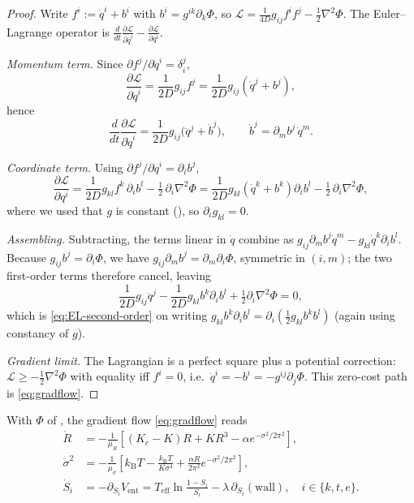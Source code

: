 \documentclass[11pt,twocolumn,a4paper]{article}
\newcommand{\Lag}{\mathcal{L}}
\newcommand{\Pot}{\Phi}
\newcommand{\kB}{k_{\mathrm{B}}}
\newcommand{\Kc}{K_c}
\newcommand{\Ord}{R}
\begin{document}
\begin{proof}
Write $f^i:=\dot q^i+b^i$ with $b^i=g^{ik}\partial_k\Pot$, so
$\Lag=\frac{1}{4D}g_{ij}f^if^j-\tfrac12\nabla^2\Pot$. The Euler--Lagrange
operator is $\frac{d}{dt}\frac{\partial\Lag}{\partial\dot q^i}
-\frac{\partial\Lag}{\partial q^i}$.

\emph{Momentum term.} Since $\partial f^j/\partial\dot q^i=\delta^j_i$,
\[
\frac{\partial\Lag}{\partial\dot q^i}=\frac{1}{2D}g_{ij}f^j
=\frac{1}{2D}g_{ij}(\dot q^j+b^j),
\]
hence
\[
\frac{d}{dt}\frac{\partial\Lag}{\partial\dot q^i}
=\frac{1}{2D}g_{ij}\big(\ddot q^j+\dot b^j\big),
\qquad \dot b^j=\partial_m b^j\,\dot q^m .
\]

\emph{Coordinate term.} Using $\partial f^j/\partial q^i=\partial_i b^j$,
\[
\frac{\partial\Lag}{\partial q^i}
=\frac{1}{2D}g_{kl}f^k\,\partial_i b^l
-\tfrac12\,\partial_i\nabla^2\Pot
=\frac{1}{2D}g_{kl}(\dot q^k+b^k)\partial_i b^l
-\tfrac12\,\partial_i\nabla^2\Pot,
\]
where we used that $g$ is constant (), so $\partial_i g_{kl}
=0$.

\emph{Assembling.} Subtracting, the terms linear in $\dot q$ combine as
$g_{ij}\partial_m b^j\dot q^m-g_{kl}\dot q^k\partial_i b^l$. Because
$g_{ij}b^j=\partial_i\Pot$, we have $g_{ij}\partial_m b^j=\partial_m\partial_i
\Pot$, symmetric in $(i,m)$; the two first-order terms therefore cancel,
leaving
\[
\frac{1}{2D}g_{ij}\ddot q^j
-\frac{1}{2D}g_{kl}b^k\partial_i b^l
+\tfrac12\partial_i\nabla^2\Pot=0,
\]
which is \eqref{eq:EL-second-order} on writing $g_{kl}b^k\partial_i b^l=
\partial_i(\tfrac12 g_{kl}b^kb^l)$ (again using constancy of $g$).

\emph{Gradient limit.} The Lagrangian is a perfect square plus a potential
correction: $\Lag\ge-\tfrac12\nabla^2\Pot$ with equality iff $f^i=0$, i.e.\
$\dot q^i=-b^i=-g^{ij}\partial_j\Pot$. This zero-cost path is
\eqref{eq:gradflow}.
\end{proof}

\begin{corollary}[Component equations]\label{cor:components}
With $\Pot$ of , the gradient flow \eqref{eq:gradflow} reads
\begin{align}
\dot\Ord&=-\tfrac{1}{\mu_R}\!\left[(\Kc-K)\Ord+K\Ord^3-\alpha e^{-\sigma^2/2\pi^2}\right],\\
\dot{\sigma}^2&=-\tfrac{1}{\mu_\sigma}\!\left[\kB T-\frac{\kB T}{K\sigma^4}
+\frac{\alpha\Ord}{2\pi^2}e^{-\sigma^2/2\pi^2}\right],\\
\dot S_i&=-\partial_{S_i}V_{\mathrm{ent}}
=T_{\mathrm{eff}}\ln\!\frac{1-S_i}{S_i}-\lambda\,\partial_{S_i}(\text{wall}),
\quad i\in\{k,t,e\}.
\end{align}
\end{corollary}
\end{document}
